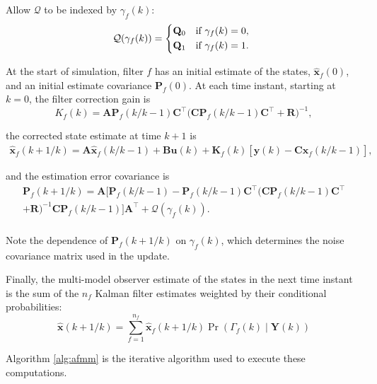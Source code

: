 Allow $\mathcal{Q}$ to be indexed by $\gamma_f(k)$:
\begin{equation} \label{eq:init_Q}
	\mathcal{Q}(\gamma_f(k)) = 
	\begin{cases*}
		\mathbf{Q}_0 & if $\gamma_f(k)=0$, \\
		\mathbf{Q}_1 & if $\gamma_f(k)=1$.
	\end{cases*}
\end{equation}

At the start of simulation, filter $f$ has an initial estimate of the states, $\mathbf{\hat{x}}_f(0)$, and an initial estimate covariance $\mathbf{P}_f(0)$. At each time instant, starting at $k=0$, the filter correction gain is
\begin{equation} \label{eq:Kf}
	K_f(k) = \mathbf{A}\mathbf{P}_f(k/k-1)\mathbf{C}^\intercal \big(\mathbf{C}\mathbf{P}_f(k/k-1)\mathbf{C}^\intercal + \mathbf{R}\big)^{-1},
\end{equation}

the corrected state estimate at time $k+1$ is
\begin{multline} \label{eq:xf_hat}
	\mathbf{\hat{x}}_f(k+1/k) = \mathbf{A} \mathbf{\hat{x}}_f(k/k-1) + \mathbf{B}\mathbf{u}(k) + 
	\mathbf{K}_f(k)\left[\mathbf{y}(k)-\mathbf{C} \mathbf{\hat{x}}_f(k/k-1)\right],
\end{multline}

and the estimation error covariance is
\begin{multline} \label{eq:Pf}
	\mathbf{P}_f(k+1/k) = \mathbf{A}\big[\mathbf{P}_f(k/k-1)
	- \mathbf{P}_f(k/k-1)\mathbf{C}^\intercal\big(\mathbf{C}\mathbf{P}_f(k/k-1)\mathbf{C}^\intercal \\ + 
	\mathbf{R}\big)^{-1}\mathbf{C}\mathbf{P}_f(k/k-1) \big]\mathbf{A}^\intercal + \mathcal{Q}(\gamma_f(k)). \\
\end{multline}

Note the dependence of $\mathbf{P}_f(k+1/k)$ on $\gamma_f(k)$, which determines the noise covariance matrix used in the update.

Finally, the multi-model observer estimate of the states in the next time instant is the sum of the $n_f$ Kalman filter estimates weighted by their conditional probabilities:
\begin{equation} \label{eq:x_hat}
	\mathbf{\hat{x}}(k+1/k) = \sum_{f=1}^{n_f} \mathbf{\hat{x}}_f(k+1/k) \Pr(\Gamma_f(k) \mid \mathbf{Y}(k))
\end{equation}

Algorithm \ref{alg:afmm} is the iterative algorithm used to execute these computations.


